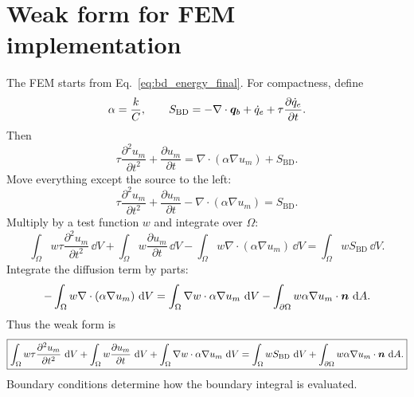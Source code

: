 \documentclass[11pt]{article}
\begin{document}
\section{Weak form for FEM implementation}
The FEM starts from Eq.~\eqref{eq:bd_energy_final}. For compactness, define
\begin{equation}
    \alpha=\frac{k}{C},
    \qquad
    S_{\mathrm{BD}}=-\nabla\cdot\bm{q}_b+\dot{q}_e+\tau\frac{\partial\dot{q}_e}{\partial t}.
\end{equation}
Then
\begin{equation}
    \tau\frac{\partial^2u_m}{\partial t^2}+\frac{\partial u_m}{\partial t}
    =\nabla\cdot(\alpha\nabla u_m)+S_{\mathrm{BD}}.
\end{equation}
Move everything except the source to the left:
\begin{equation}
    \tau\frac{\partial^2u_m}{\partial t^2}+\frac{\partial u_m}{\partial t}
    -\nabla\cdot(\alpha\nabla u_m)=S_{\mathrm{BD}}.
\end{equation}
Multiply by a test function \(w\) and integrate over \(\Omega\):
\begin{equation}
    \int_\Omega w\tau\frac{\partial^2u_m}{\partial t^2}\,\dd V
    +\int_\Omega w\frac{\partial u_m}{\partial t}\,\dd V
    -\int_\Omega w\nabla\cdot(\alpha\nabla u_m)\,\dd V
    =\int_\Omega wS_{\mathrm{BD}}\,\dd V.
\end{equation}
Integrate the diffusion term by parts:
\begin{equation}
    -\int_\Omega w\nabla\cdot(\alpha\nabla u_m)\,\mathop{}\!\mathrm{d} V
    =\int_\Omega \nabla w\cdot\alpha\nabla u_m\,\mathop{}\!\mathrm{d} V
    -\int_{\partial\Omega}w\alpha\nabla u_m\cdot\bm{n}\,\mathop{}\!\mathrm{d} A.
\end{equation}
Thus the weak form is
\begin{equation}
    \boxed{
    \int_\Omega w\tau\frac{\partial^2u_m}{\partial t^2}\,\mathop{}\!\mathrm{d} V
    +\int_\Omega w\frac{\partial u_m}{\partial t}\,\mathop{}\!\mathrm{d} V
    +\int_\Omega \nabla w\cdot\alpha\nabla u_m\,\mathop{}\!\mathrm{d} V
    =\int_\Omega wS_{\mathrm{BD}}\,\mathop{}\!\mathrm{d} V
    +\int_{\partial\Omega}w\alpha\nabla u_m\cdot\bm{n}\,\mathop{}\!\mathrm{d} A.}
    \label{eq:bd_weak_form}
\end{equation}
Boundary conditions determine how the boundary integral is evaluated.
\end{document}
